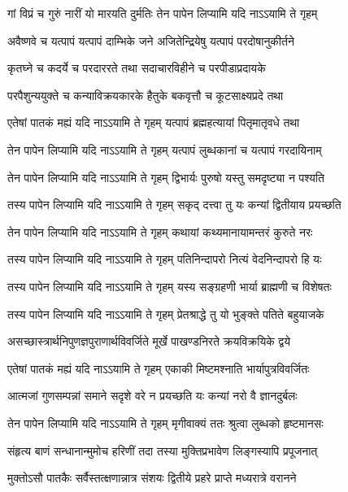\twolineshloka
{गां विप्रं च गुरुं नारीं यो मारयति दुर्मतिः}
{तेन पापेन लिप्यामि यदि नाऽऽयामि ते गृहम्}%

\twolineshloka
{अवैष्णवे च यत्पापं यत्पापं दाम्भिके जने}
{अजितेन्द्रियेषु यत्पापं परदोषानुकीर्तने}%

\twolineshloka
{कृतघ्ने च कदर्ये च परदाररते तथा}
{सदाचारविहीने च परपीडाप्रदायके}%

\twolineshloka
{परपैशुन्ययुक्ते च कन्याविक्रयकारके}
{हैतुके बकवृत्तौ च कूटसाक्ष्यप्रदे तथा}%

\twolineshloka
{एतेषां पातकं मह्यं यदि नाऽऽयामि ते गृहम्}
{यत्पापं ब्रह्महत्यायां पितृमातृवधे तथा}%

\twolineshloka
{तेन पापेन लिप्यामि यदि नाऽऽयामि ते गृहम्}
{यत्पापं लुब्धकानां च यत्पापं गरदायिनाम्}%

\twolineshloka
{तेन पापेन लिप्यामि यदि नाऽऽयामि ते गृहम्}
{द्विभार्यः पुरुषो यस्तु समदृष्ट्या न पश्यति}%

\twolineshloka
{तस्य पापेन लिप्यामि यदि नाऽऽयामि ते गृहम्}
{सकृद् दत्त्वा तु यः कन्यां द्वितीयाय प्रयच्छति}%

\twolineshloka
{तेन पापेन लिप्यामि यदि नाऽऽयामि ते गृहम्}
{कथायां कथ्यमानायामन्तरं कुरुते नरः}%

\twolineshloka
{तस्य पापेन लिप्यामि यदि नाऽऽयामि ते गृहम्}
{पतिनिन्दापरो नित्यं वेदनिन्दापरो हि यः}%

\twolineshloka
{तस्य पापेन लिप्यामि यदि नाऽऽयामि ते गृहम्}
{यस्य सङ्ग्रहणी भार्या ब्राह्मणी च विशेषतः}%

\twolineshloka
{तस्य पापेन लिप्यामि यदि नाऽऽयामि ते गृहम्}
{प्रेतश्राद्धे तु यो भुङ्क्ते पतिते बहुयाजके}%

\twolineshloka
{असच्छास्त्रार्थनिपुणज्ञपुराणार्थविवर्जिते}
{मूर्खे पाखण्डनिरते क्रयविक्रयिके द्वये}%

\twolineshloka
{एतेषां पातकं मह्यं यदि नाऽऽयामि ते गृहम्}
{एकाकी मिष्टमश्नाति भार्यापुत्रविवर्जितः}%

\twolineshloka
{आत्मजां गुणसम्पन्नां समाने सदृशे वरे}
{न प्रयच्छति यः कन्यां नरो वै ज्ञानदुर्बलः}%

\twolineshloka
{तेन पापेन लिप्यामि यदि नाऽऽयामि ते गृहम्}
{मृगीवाक्यं ततः श्रुत्वा लुब्धको हृष्टमानसः}%

\twolineshloka
{संहृत्य बाणं सन्धानान्मुमोच हरिणीं तदा}
{तस्या मुक्तिप्रभावेण लिङ्गस्यापि प्रपूजनात्}%

\twolineshloka
{मुक्तोऽसौ पातकैः सर्वैस्तत्क्षणान्नात्र संशयः}
{द्वितीये प्रहरे प्राप्ते मध्यरात्रे वरानने}%

